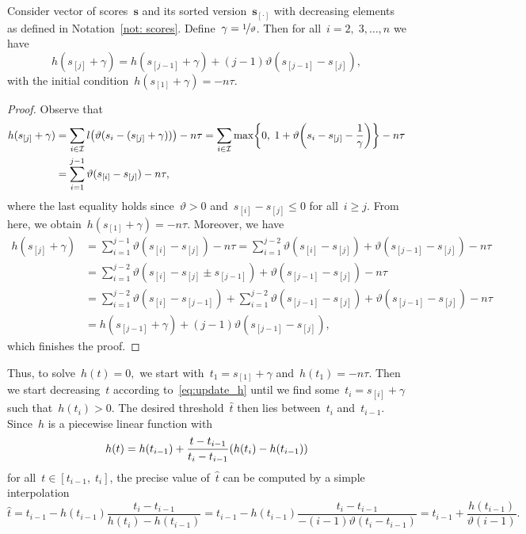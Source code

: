 \begin{lemma}
  Consider vector of scores~$\bm{s}$ and its sorted version~$\bm{s}_{[\cdot]}$ with decreasing elements as defined in Notation~\ref{not: scores}. Define~$\gamma = \nicefrac{1}{\vartheta}$. Then for all~$i = 2, \; 3, \ldots, n$ we have
  \begin{equation}\label{eq:update_h}
    h(s_{[j]} + \gamma) = h(s_{[j - 1]} + \gamma) + (j - 1) \vartheta(s_{[j - 1]} - s_{[j]}),
  \end{equation}
  with the initial condition~$h(s_{[1]} + \gamma) = -n\tau.$
\end{lemma}
\begin{proof}
Observe that
\begin{align*}
  h(s_{[j]}+\gamma)
    & = \sum_{i \in \I} l\Brac{\vartheta(s_i - (s_{[j]} + \gamma))} - n\tau
    = \sum_{i \in \I} \max\Brac[c]{0,\; 1 + \vartheta\Brac{s_i - s_{[j]} - \frac{1}{\gamma}}} - n\tau \\
    & = \sum_{i = 1}^{j - 1} \vartheta(s_{[i]} - s_{[j]}) - n\tau,
\end{align*}
where the last equality holds since~$\vartheta > 0$ and~$s_{[i]} - s_{[j]} \leq 0$ for all~$i \geq j.$ From here, we obtain~$h(s_{[1]} + \gamma) = -n\tau$. Moreover, we have
\begin{align*}
  h(s_{[j]} + \gamma)
  & = \sum_{i = 1}^{j - 1} \vartheta(s_{[i]} - s_{[j]}) - n\tau
    = \sum_{i = 1}^{j - 2} \vartheta(s_{[i]} - s_{[j]}) + \vartheta(s_{[j-1]} - s_{[j]}) - n\tau \\
  & = \sum_{i = 1}^{j - 2} \vartheta(s_{[i]} - s_{[j]} \pm s_{[j - 1]}) + \vartheta(s_{[j-1]} - s_{[j]}) - n\tau \\
  & = \sum_{i = 1}^{j - 2} \vartheta(s_{[i]} - s_{[j - 1]}) + \sum_{i = 1}^{j - 2} \vartheta(s_{[j - 1]} - s_{[j]}) + \vartheta(s_{[j - 1]} - s_{[j]}) - n\tau \\
  & = h(s_{[j - 1]} + \gamma) + (j - 1) \vartheta(s_{[j - 1]} - s_{[j]}),
\end{align*}
which finishes the proof.
\end{proof}

Thus, to solve~$h(t) = 0,$ we start with~$t_1 = s_{[1]}  + \gamma$ and~$h(t_1) = -n\tau$. Then we start decreasing~$t$ according to~\eqref{eq:update_h} until we find some~$t_i = s_{[i]} + \gamma$ such that~$h(t_i) > 0$. The desired threshold~$\hat{t}$ then lies between~$t_i$ and~$t_{i-1}$. Since~$h$ is a piecewise linear function with
\begin{equation*}
  h(t) = h(t_{i-1}) + \frac{t - t_{i-1}}{t_{i} - t_{i-1}}\Brac{h(t_{i}) - h(t_{i-1})}
\end{equation*}
for all~$t \in [t_{i-1}, \; t_{i}]$, the precise value of~$\hat{t}$ can be computed by a simple interpolation
\begin{equation*}
  \hat{t}
    = t_{i-1} - h(t_{i-1})\frac{t_{i} - t_{i-1}}{h(t_{i}) - h(t_{i-1})}
    = t_{i-1} - h(t_{i-1})\frac{t_{i} - t_{i-1}}{-(i-1)\vartheta(t_{i} - t_{i-1})}
    = t_{i-1} + \frac{h(t_{i-1})}{\vartheta(i-1)}.
\end{equation*}

